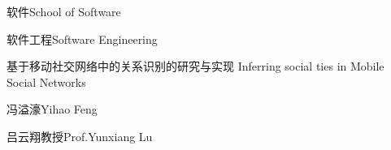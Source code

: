 
\school
{软件}{School of Software}

\major
{软件工程}{Software Engineering}

\thesistitle
{基于移动社交网络中的关系识别的研究与实现}
{}
{Inferring social ties in Mobile Social Networks}
{}

\thesisauthor
{冯溢濠}{Yihao Feng}

\teacher
{吕云翔教授}{Prof.Yunxiang Lu}







